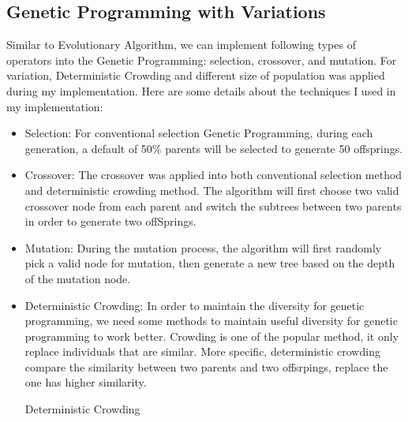 \documentclass[12pt]{article}
\begin{document}
\subsection{Genetic Programming with Variations}
Similar to Evolutionary Algorithm, we can implement following types of operators into the Genetic Programming: selection, crossover, and mutation. For variation, Deterministic Crowding and different size of population was applied during my implementation. Here are some details about the techniques I used in my implementation:\\
\vspace{-5mm}
\begin{itemize}
	\setlength\itemsep{0.1em}
	\item Selection: For conventional selection Genetic Programming, during each generation, a default of 50\% parents will be selected to generate 50 offsprings.
	\item Crossover: The crossover was applied into both conventional selection method and deterministic crowding method. The algorithm will first choose two valid crossover node from each parent and switch the subtrees between two parents in order to generate two offSprings.
	\item Mutation: During the mutation process, the algorithm will first randomly pick a valid node for mutation, then generate a new tree based on the depth of the mutation node.
	\item Deterministic Crowding: In order to maintain the diversity for genetic programming, we need some methods to maintain useful diversity for genetic programming to work better. Crowding is one of the popular method, it only replace individuals that are similar. More specific, deterministic crowding compare the similarity between two parents and two offsrpings, replace the one has higher similarity.\\
	
\begin{algorithm}[H]
\caption{Deterministic Crowding}
\begin{algorithmic}[1]
\Else {}
\EndIf
\EndProcedure
\end{algorithmic}
\end{algorithm}

\end{itemize}
\end{document}
